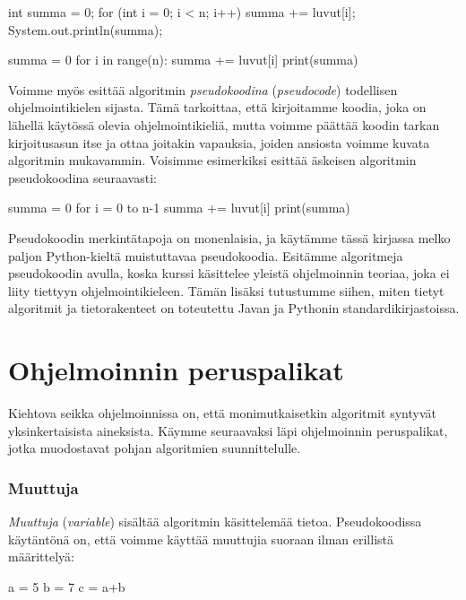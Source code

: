 \begin{code}
int summa = 0;
for (int i = 0; i < n; i++) {
    summa += luvut[i];
}
System.out.println(summa);
\end{code}

\begin{code}
summa = 0
for i in range(n):
    summa += luvut[i]
print(summa)
\end{code}


Voimme myös esittää algoritmin \emph{pseudokoodina} (\emph{pseudocode})
todellisen ohjelmointikielen sijasta.
Tämä tarkoittaa, että kirjoitamme koodia,
joka on lähellä käytössä olevia ohjelmointikieliä, mutta voimme
päättää koodin tarkan kirjoitusasun itse ja ottaa joitakin vapauksia,
joiden ansiosta voimme kuvata algoritmin mukavammin.
Voisimme esimerkiksi esittää äskeisen algoritmin pseudokoodina seuraavasti:

\begin{code}
summa = 0
for i = 0 to n-1
    summa += luvut[i]
print(summa)
\end{code}

Pseudokoodin merkintätapoja on monenlaisia, ja
käytämme tässä kirjassa melko paljon Python-kieltä muistuttavaa pseudokoodia.
Esitämme algoritmeja pseudokoodin avulla,
koska kurssi käsittelee yleistä ohjelmoinnin teoriaa,
joka ei liity tiettyyn ohjelmointikieleen.
Tämän lisäksi tutustumme siihen, miten tietyt algoritmit
ja tietorakenteet on toteutettu Javan ja Pythonin
standardikirjastoissa.

\section{Ohjelmoinnin peruspalikat}

Kiehtova seikka ohjelmoinnissa on, että monimutkaisetkin algoritmit
syntyvät yksinkertaisista aineksista.
Käymme seuraavaksi läpi ohjelmoinnin peruspalikat,
jotka muodostavat pohjan algoritmien suunnittelulle.

\subsubsection{Muuttuja}

\emph{Muuttuja} (\emph{variable}) sisältää algoritmin
käsittelemää tietoa.
Pseudokoodissa käytäntönä on, että voimme käyttää muuttujia
suoraan ilman erillistä määrittelyä:

\begin{code}
a = 5
b = 7
c = a+b
\end{code}

